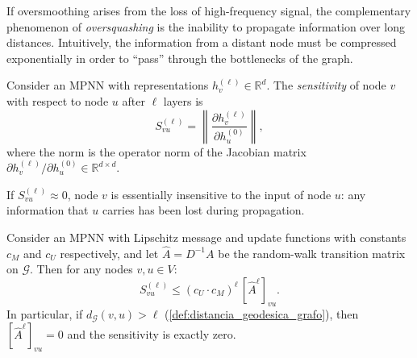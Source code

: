 If \gls{oversmoothing} arises from the loss of high-frequency signal, the complementary phenomenon of \textit{\gls{oversquashing}} is the inability to propagate information over long distances. Intuitively, the information from a distant node must be compressed exponentially in order to ``pass'' through the bottlenecks of the graph.

\begin{definition}\label{def:sensibilidad_mpnn}
	Consider an \gls{MPNN} with representations $h_v^{(\ell)} \in \mathbb{R}^d$. The \textit{sensitivity} of node $v$ with respect to node $u$ after $\ell$ layers is
	\[
		S_{vu}^{(\ell)} = \left\|\frac{\partial h_v^{(\ell)}}{\partial h_u^{(0)}}\right\|,
	\]
	where the norm is the operator norm of the Jacobian matrix $\partial h_v^{(\ell)} / \partial h_u^{(0)} \in \mathbb{R}^{d \times d}$.
\end{definition}

If $S_{vu}^{(\ell)} \approx 0$, node $v$ is essentially insensitive to the input of node $u$: any information that $u$ carries has been lost during propagation.

\begin{proposition}\label{prop:oversquashing_exponencial}
	Consider an \gls{MPNN} with Lipschitz message and update functions with constants $c_M$ and $c_U$ respectively, and let $\hat{A} = D^{-1}A$ be the random-walk transition matrix on $\mathcal{G}$. Then for any nodes $v, u \in V$:
	\begin{equation}\label{eq:oversquashing_bound}
		S_{vu}^{(\ell)} \leq (c_U \cdot c_M)^\ell\, [\hat{A}^\ell]_{vu}.
	\end{equation}
	In particular, if $d_\mathcal{G}(v, u) > \ell$ (\autoref{def:distancia_geodesica_grafo}), then $[\hat{A}^\ell]_{vu} = 0$ and the sensitivity is exactly zero.
\end{proposition}

